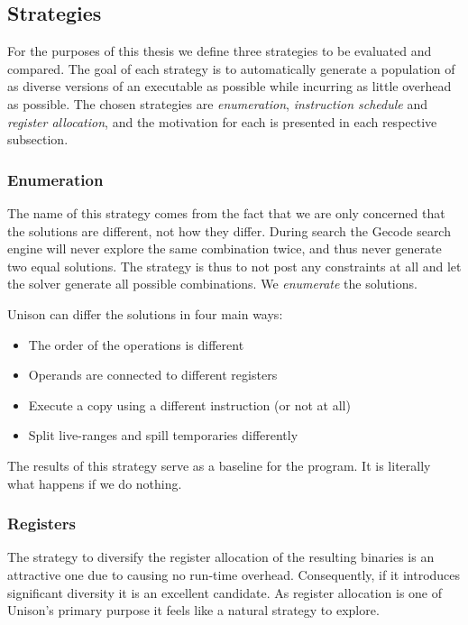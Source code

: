 \subsection{Strategies}
\label{sec:strategies}

For the purposes of this thesis we define three strategies to be evaluated and compared.
The goal of each strategy is to automatically generate a population of as diverse versions
of an executable as possible while incurring as little overhead as possible. The chosen
strategies are \textit{enumeration}, \textit{instruction schedule} and
\textit{register allocation}, and the motivation for each is presented in each respective
subsection.

\subsubsection{Enumeration}

The name of this strategy comes from the fact that we are only concerned that the solutions
are different, not how they differ. During search the Gecode search engine will never
explore the same combination twice, and thus never generate two equal solutions. The
strategy is thus to not post any constraints at all and let the solver generate all
possible combinations. We \textit{enumerate} the solutions.

Unison can differ the solutions in four main ways:

\begin{itemize}
	\item The order of the operations is different
	\item Operands are connected to different registers
	\item Execute a copy using a different instruction (or not at all)
	\item Split live-ranges and spill temporaries differently
\end{itemize}

The results of this strategy serve as a baseline for the program. It is literally what
happens if we do nothing.

\subsubsection{Registers}

The strategy to diversify the register allocation of the resulting binaries is an attractive
one due to causing no run-time overhead. Consequently, if it introduces significant diversity
it is an excellent candidate. As register allocation is one of Unison's primary purpose it
feels like a natural strategy to explore.

